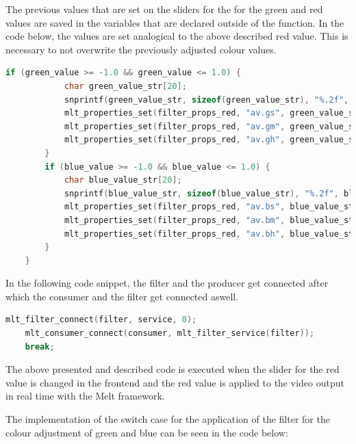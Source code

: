 \documentclass[../MasterThesis.tex]{subfiles}
\begin{document}
The previous values that are set on the sliders for the for the green and red values are saved in the variables that are declared outside of the function. In the code below, the values are set analogical to the above described red value. This is necessary to not overwrite the previously adjusted colour values.
	
\begin{lstlisting}[language=c, numbers=none, columns=fullflexible]
		if (green_value >= -1.0 && green_value <= 1.0) {
			char green_value_str[20]; 
			snprintf(green_value_str, sizeof(green_value_str), "%.2f", green_value);
			mlt_properties_set(filter_props_red, "av.gs", green_value_str);
			mlt_properties_set(filter_props_red, "av.gm", green_value_str);	
			mlt_properties_set(filter_props_red, "av.gh", green_value_str);
		} 			
		if (blue_value >= -1.0 && blue_value <= 1.0) {
			char blue_value_str[20]; 
			snprintf(blue_value_str, sizeof(blue_value_str), "%.2f", blue_value);
			mlt_properties_set(filter_props_red, "av.bs", blue_value_str);
			mlt_properties_set(filter_props_red, "av.bm", blue_value_str);	
			mlt_properties_set(filter_props_red, "av.bh", blue_value_str);
		}					
	}
\end{lstlisting}

In the following code snippet, the filter and the producer get connected after which the consumer and the filter get connected aswell.


\begin{lstlisting}[language=c, numbers=none, columns=fullflexible]
	mlt_filter_connect(filter, service, 0);
	mlt_consumer_connect(consumer, mlt_filter_service(filter));
	break;			
\end{lstlisting}

The above presented and described code is executed when the slider for the red value is changed in the frontend and the red value is applied to the video output in real time with the Melt framework.

The implementation of the switch case for the application of the filter for the colour adjustment of green and blue can be seen in the code below:

\newpage
\end{document}
